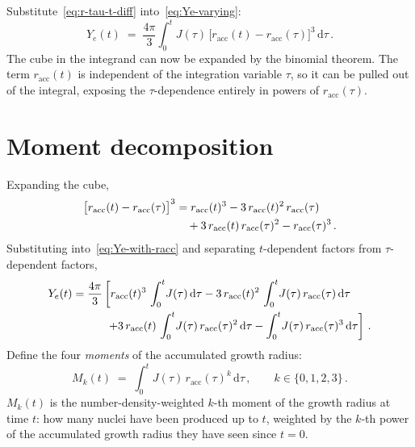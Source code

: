 \documentclass[11pt]{article}
\begin{document}
Substitute~\eqref{eq:r-tau-t-diff} into~\eqref{eq:Ye-varying}:
\begin{equation}
Y_e(t) \;=\; \frac{4\pi}{3}\int_{0}^{t}\! J(\tau)\,
    \bigl[r_{\text{acc}}(t) - r_{\text{acc}}(\tau)\bigr]^{3}\, \mathrm{d}\tau\,.
\label{eq:Ye-with-racc}
\end{equation}
The cube in the integrand can now be expanded by the binomial theorem.
The term $r_{\text{acc}}(t)$ is independent of the integration variable
$\tau$, so it can be pulled out of the integral, exposing the
$\tau$-dependence entirely in powers of $r_{\text{acc}}(\tau)$.

\section{Moment decomposition}

Expanding the cube,
\begin{align}
\bigl[r_{\text{acc}}(t) - r_{\text{acc}}(\tau)\bigr]^{3} &=
     r_{\text{acc}}(t)^{3} - 3\, r_{\text{acc}}(t)^{2}\, r_{\text{acc}}(\tau) \notag \\
&\quad + 3\, r_{\text{acc}}(t)\, r_{\text{acc}}(\tau)^{2} - r_{\text{acc}}(\tau)^{3}\,.
\end{align}
Substituting into~\eqref{eq:Ye-with-racc} and separating
$t$-dependent factors from $\tau$-dependent factors,
\begin{align}
Y_e(t) &= \frac{4\pi}{3}\left[
    r_{\text{acc}}(t)^{3}\, \int_{0}^{t}\! J(\tau)\, \mathrm{d}\tau
  - 3\, r_{\text{acc}}(t)^{2}\, \int_{0}^{t}\! J(\tau)\, r_{\text{acc}}(\tau)\, \mathrm{d}\tau
  \right. \notag \\
&\hphantom{= \frac{4\pi}{3}\left[\right.}\left.
  + 3\, r_{\text{acc}}(t)\,     \int_{0}^{t}\! J(\tau)\, r_{\text{acc}}(\tau)^{2}\, \mathrm{d}\tau
  -                              \int_{0}^{t}\! J(\tau)\, r_{\text{acc}}(\tau)^{3}\, \mathrm{d}\tau
  \right]\,.
\label{eq:Ye-decomposed}
\end{align}
Define the four \emph{moments} of the accumulated growth radius:
\begin{equation}
M_{k}(t) \;=\; \int_{0}^{t}\! J(\tau)\, r_{\text{acc}}(\tau)^{k}\, \mathrm{d}\tau\,,
\qquad k \in \{0, 1, 2, 3\}\,.
\label{eq:moments-def}
\end{equation}
$M_k(t)$ is the number-density-weighted $k$-th moment of the growth
radius at time $t$: how many nuclei have been produced up to $t$,
weighted by the $k$-th power of the accumulated growth radius they
have seen since $t=0$.
\end{document}
